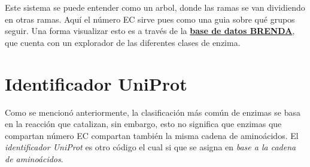 Este sistema se puede entender como un arbol, donde las ramas se van dividiendo en otras ramas. Aquí el número EC sirve pues como una guia sobre qué grupos seguir. Una forma visualizar esto es a través de la \textbf{\href{https://www.brenda-enzymes.org/ecexplorer2.php?browser=1}{base de datos BRENDA}}, que cuenta con un explorador de las diferentes clases de enzima.

\section{Identificador UniProt}

Como se mencionó anteriormente, la clasificación más común de enzimas se basa en la reacción que catalizan, sin embargo, esto no significa que enzimas que compartan número EC compartan también la misma cadena de aminoácidos. El \emph{identificador UniProt} es otro código el cual si que se asigna en \emph{base a la cadena de aminoácidos}.

